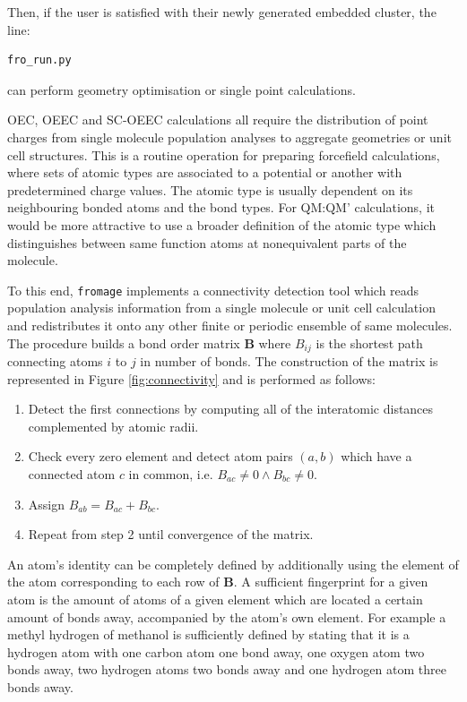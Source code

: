 Then, if the user is satisfied with their newly generated embedded cluster, the line:
\begin{verbatim}
fro_run.py
\end{verbatim}
can perform geometry optimisation or single point calculations.

OEC, OEEC and SC-OEEC calculations all require the distribution of point charges from single molecule population analyses to aggregate geometries or unit cell structures. This is a routine operation for preparing forcefield calculations, where sets of atomic types are associated to a potential or another with predetermined charge values.\cite{Wang2004,Wang2006} The atomic type is usually dependent on its neighbouring bonded atoms and the bond types. For QM:QM' calculations, it would be more attractive to use a broader definition of the atomic type which distinguishes between same function atoms at nonequivalent parts of the molecule.

To this end, \texttt{fromage} implements a connectivity detection tool which reads population analysis information from a single molecule or unit cell calculation and redistributes it onto any other finite or periodic ensemble of same molecules. The procedure builds a bond order matrix $\mathbf{B}$ where $B_{ij}$ is the shortest path connecting atoms $i$ to $j$ in number of bonds. The construction of the matrix is represented in Figure \ref{fig:connectivity} and is performed as follows:
\begin{enumerate}
  \item Detect the first connections by computing all of the interatomic distances complemented by atomic radii.
  \item Check every zero element and detect atom pairs $(a,b)$ which have a connected atom $c$ in common, i.e. $B_{ac} \neq 0 \land B_{bc} \neq 0$.
  \item Assign $B_{ab} = B_{ac} + B_{bc}$.
  \item Repeat from step 2 until convergence of the matrix.
\end{enumerate}

An atom's identity can be completely defined by additionally using the element of the atom corresponding to each row of $\textbf{B}$. A sufficient fingerprint for a given atom is the amount of atoms of a given element which are located a certain amount of bonds away, accompanied by the atom's own element. For example a methyl hydrogen of methanol is sufficiently defined by stating that it is a hydrogen atom with one carbon atom one bond away, one oxygen atom two bonds away, two hydrogen atoms two bonds away and one hydrogen atom three bonds away.



